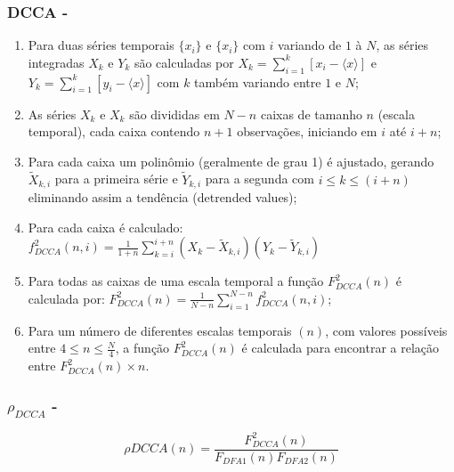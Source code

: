 \documentclass[10pt]{beamer}
\newcommand{\pdcca}{\({\rho}_{DCCA}\) }
\begin{document}
\begin{frame}
  \frametitle{DCCA - \cite{Podobnik2008}}
  \begin{enumerate}
    \label{list:dcca}
    \item Para duas séries temporais \(\{x_{i}\}\) e \(\{x_{i}\}\) com  \(i\) variando de  \(1\) à \(N\), as séries integradas \(X_{k}\) e \(Y_{k}\) são calculadas por \(X_{k} = \sum_{i=1}^{k}\left[x_{i} - \langle x \rangle \right] \) e \(Y_{k} = \sum_{i=1}^{k}\left[y_{i} - \langle x \rangle \right] \) com \(k\) também variando entre \(1\) e \(N\);
    \item As séries  \(X_{k}\) e \(X_{k}\) são divididas em \(N - n\) caixas de tamanho \(n\) (escala temporal), cada caixa contendo \(n + 1\) observações, iniciando em \(i\) até \(i + n\);
    \item Para cada caixa um polinômio (geralmente de grau 1) é ajustado, gerando \(\widetilde{X}_{k, i}\) para a primeira série e \(\widetilde{Y}_{k, i}\) para a segunda com \( i \le k \le (i + n) \) eliminando assim a tendência (detrended values);
    \item  Para cada caixa é calculado: $f_{DCCA}^{2}(n, i) = \frac{1}{1+n} \sum_{k=i}^{i + n}(X_{k}-\widetilde{X}_{k, i})(Y_{k}-\widetilde{Y}_{k, i})$
    \item Para todas as caixas de uma escala temporal a função $F_{DCCA}^{2}(n)$ é calculada por: $F_{DCCA}^{2}(n) = \frac{1}{N-n} \sum_{i=1}^{N-n} f_{DCCA}^{2}(n, i)$;
    \item Para um número de diferentes escalas temporais $(n)$, com valores possíveis entre \( 4 \le n \le \frac{N}{4}\), a função $F_{DCCA}^{2}(n)$ é calculada para encontrar a relação entre $F_{DCCA}^{2}(n) \times n$.
  \end{enumerate}
  
\end{frame}

\begin{frame}
  \frametitle{\pdcca - \cite{Zebende2011}}

  \begin{equation}
    \label{eq_pdcca}
    \rho DCCA(n) = \frac{F_{DCCA}^2 (n)}{ F_{DFA1} (n) F_{DFA2} (n)}
  \end{equation}

\end{frame}
\end{document}
